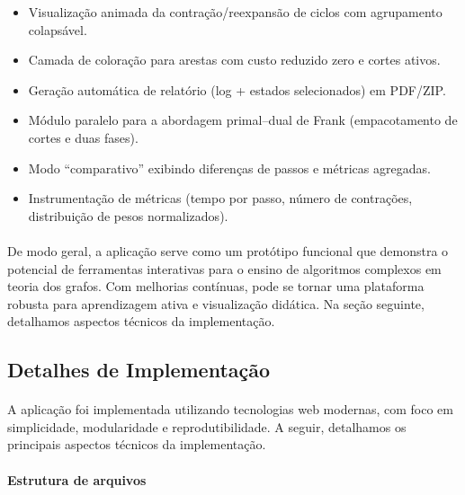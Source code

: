 \documentclass[12pt,a4paper]{article}
\begin{document}
\begin{itemize}\setlength{\itemsep}{2pt}
    \item Visualização animada da contração/reexpansão de ciclos com agrupamento colapsável.
    \item Camada de coloração para arestas com custo reduzido zero e cortes ativos.
    \item Geração automática de relatório (log + estados selecionados) em PDF/ZIP.
    \item Módulo paralelo para a abordagem primal--dual de Frank (empacotamento de cortes e duas fases).
    \item Modo “comparativo” exibindo diferenças de passos e métricas agregadas.
    \item Instrumentação de métricas (tempo por passo, número de contrações, distribuição de pesos normalizados).
\end{itemize}

\paragraph{}
De modo geral, a aplicação serve como um protótipo funcional que demonstra o potencial de ferramentas interativas para o ensino de algoritmos complexos em teoria dos grafos. Com melhorias contínuas, pode se tornar uma plataforma robusta para aprendizagem ativa e visualização didática. Na seção seguinte, detalhamos aspectos técnicos da implementação.

\subsection{Detalhes de Implementação}
\paragraph{}
A aplicação foi implementada utilizando tecnologias web modernas, com foco em simplicidade, modularidade e reprodutibilidade. A seguir, detalhamos os principais aspectos técnicos da implementação.

\paragraph{Estrutura de arquivos}
\end{document}
